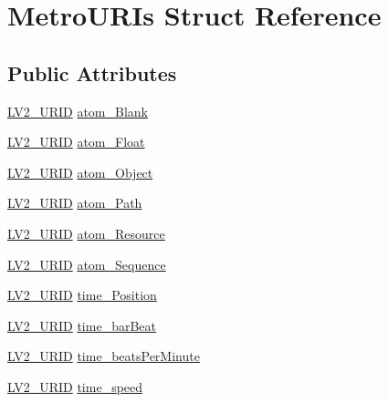\hypertarget{struct_metro_u_r_is}{}\section{Metro\+U\+R\+Is Struct Reference}
\label{struct_metro_u_r_is}
\subsection*{Public Attributes}
\begin{DoxyCompactItemize}
\item 
\hyperlink{urid_8h_a5ff0630d245539e9f6dca10ff3c40fae}{L\+V2\+\_\+\+U\+R\+ID} \hyperlink{struct_metro_u_r_is_a1f4ba7ae215de8c0c56e93d233b3bbbf}{atom\+\_\+\+Blank}
\item 
\hyperlink{urid_8h_a5ff0630d245539e9f6dca10ff3c40fae}{L\+V2\+\_\+\+U\+R\+ID} \hyperlink{struct_metro_u_r_is_a1d777756e182145071e0b2dabcef3196}{atom\+\_\+\+Float}
\item 
\hyperlink{urid_8h_a5ff0630d245539e9f6dca10ff3c40fae}{L\+V2\+\_\+\+U\+R\+ID} \hyperlink{struct_metro_u_r_is_a4b2184441fd87fa4ab946c09d934bfe6}{atom\+\_\+\+Object}
\item 
\hyperlink{urid_8h_a5ff0630d245539e9f6dca10ff3c40fae}{L\+V2\+\_\+\+U\+R\+ID} \hyperlink{struct_metro_u_r_is_a0f32d5d15a0c148a2780fef0934717c2}{atom\+\_\+\+Path}
\item 
\hyperlink{urid_8h_a5ff0630d245539e9f6dca10ff3c40fae}{L\+V2\+\_\+\+U\+R\+ID} \hyperlink{struct_metro_u_r_is_ae8da223c791cab8ccaeee39b12ae660b}{atom\+\_\+\+Resource}
\item 
\hyperlink{urid_8h_a5ff0630d245539e9f6dca10ff3c40fae}{L\+V2\+\_\+\+U\+R\+ID} \hyperlink{struct_metro_u_r_is_a100cf36f8082356b0d11c8926ee9c62e}{atom\+\_\+\+Sequence}
\item 
\hyperlink{urid_8h_a5ff0630d245539e9f6dca10ff3c40fae}{L\+V2\+\_\+\+U\+R\+ID} \hyperlink{struct_metro_u_r_is_a787befdd2e58b0f39841dfb57a5d6173}{time\+\_\+\+Position}
\item 
\hyperlink{urid_8h_a5ff0630d245539e9f6dca10ff3c40fae}{L\+V2\+\_\+\+U\+R\+ID} \hyperlink{struct_metro_u_r_is_ac92f58d7b17bf804f64fb36d4926d0b4}{time\+\_\+bar\+Beat}
\item 
\hyperlink{urid_8h_a5ff0630d245539e9f6dca10ff3c40fae}{L\+V2\+\_\+\+U\+R\+ID} \hyperlink{struct_metro_u_r_is_adbeb8a85d53422e2e0265f2253656b34}{time\+\_\+beats\+Per\+Minute}
\item 
\hyperlink{urid_8h_a5ff0630d245539e9f6dca10ff3c40fae}{L\+V2\+\_\+\+U\+R\+ID} \hyperlink{struct_metro_u_r_is_a9c3ce1aef1da4a782887ecc8a1e2ba23}{time\+\_\+speed}
\end{DoxyCompactItemize}


